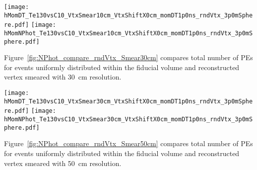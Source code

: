 \begin{figure*}[ht]
  \centering
  \texttt{[image: hMomDT\_Te130vsC10\_VtxSmear10cm\_VtxShiftX0cm\_momDT1p0ns\_rndVtx\_3p0mSphere.pdf]}
  \texttt{[image: hMomNPhot\_Te130vsC10\_VtxSmear10cm\_VtxShiftX0cm\_momDT1p0ns\_rndVtx\_3p0mSphere.pdf]}
  \caption{(Left) Difference between measured PE arrival time and arrival time prediction based on
        vertex location (T$^{predicted} = |r_{hit} - r_{vtx}|/v_{phot}$, where $v_phot = c/1.53$).
        $\vbb$-decay (black solid line) and $\Cten$ events (magenta dashed line) are compared.
        Vertical line at 1~ns indicates cut for early light selection.
        (Right) Total number of PEs in the early light sample.
        $^{10}$C events with energy deposition in the range between 2.1 and 2.9~MeV are
        selected. Verticies are uniformly distributed within the fiducial volume, $R<3$~m.
        {\bf Vetrex is smeared with 10~cm resolution.}}
\label{fig:NPhot_compare_rndVtx_Smear10cm}
\end{figure*}



Figure~\ref{fig:NPhot_compare_rndVtx_Smear30cm} compares total number of PEs for events uniformly
distributed within the fiducial volume and reconstructed vertex smeared with 30~cm resolution.

\begin{figure*}[ht]
  \centering
  \texttt{[image: hMomDT\_Te130vsC10\_VtxSmear30cm\_VtxShiftX0cm\_momDT1p0ns\_rndVtx\_3p0mSphere.pdf]}
  \texttt{[image: hMomNPhot\_Te130vsC10\_VtxSmear30cm\_VtxShiftX0cm\_momDT1p0ns\_rndVtx\_3p0mSphere.pdf]}
  \caption{(Left) Difference between measured PE arrival time and arrival time prediction based on
        vertex location (T$^{predicted} = |r_{hit} - r_{vtx}|/v_{phot}$, where $v_phot = c/1.53$).
        $\vbb$-decay (black solid line) and $\Cten$ events (magenta dashed line) are compared.
        Vertical line at 1~ns indicates cut for early light selection.
        (Right) Total number of PEs in the early light sample.
        $^{10}$C events with energy deposition in the range between 2.1 and 2.9~MeV are
        selected. Verticies are uniformly distributed within the fiducial volume, $R<3$~m.
        {\bf Vetrex is smeared with 30~cm resolution.}}
\label{fig:NPhot_compare_rndVtx_Smear30cm}
\end{figure*}


Figure~\ref{fig:NPhot_compare_rndVtx_Smear50cm} compares total number of PEs for events uniformly
distributed within the fiducial volume and reconstructed vertex smeared with 50~cm resolution.

